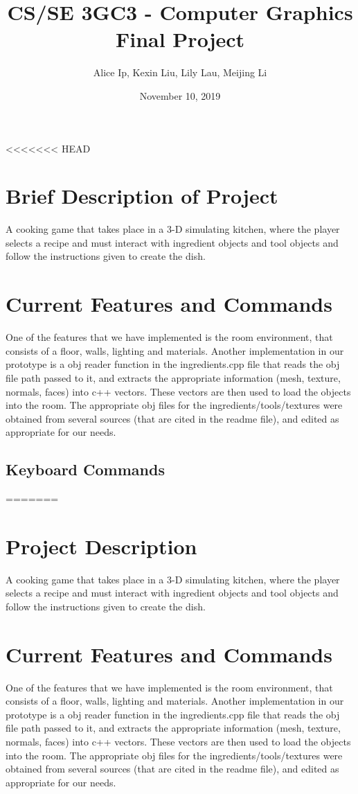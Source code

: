 \documentclass[11pt]{article}
\author{Alice Ip, Kexin Liu, Lily Lau, Meijing Li}
\date{November 10, 2019}
\title{CS/SE 3GC3 - Computer Graphics Final Project}
\begin{document}
\maketitle

<<<<<<< HEAD
\section*{Brief Description of Project}
\label{sec:org14152ec}
A cooking game that takes place in a 3-D simulating kitchen, where the player selects a recipe and must interact with ingredient objects and tool objects and follow the instructions given to create the dish.


\section*{Current Features and Commands}
\label{sec:orga6520a9}
One of the features that we have implemented is the room environment, that consists of a floor, walls, lighting and materials. Another implementation in our prototype is a obj reader function in the ingredients.cpp file that reads the obj file path passed to it, and extracts the appropriate information (mesh, texture, normals, faces) into c++ vectors. These vectors are then used to load the objects into the room. The appropriate obj files for the ingredients/tools/textures were obtained from several sources (that are cited in the readme file), and edited as appropriate for our needs. 

\subsection*{Keyboard Commands}
\label{sec:org454b11b}
=======
\section*{Project Description}
\label{sec:org20b9486}
A cooking game that takes place in a 3-D simulating kitchen, where the player selects a recipe and must interact with ingredient objects and tool objects and follow the instructions given to create the dish.

\section*{Current Features and Commands}
\label{sec:org2a7d9f6}
One of the features that we have implemented is the room environment, that consists of a floor, walls, lighting and materials. Another implementation in our prototype is a obj reader function in the ingredients.cpp file that reads the obj file path passed to it, and extracts the appropriate information (mesh, texture, normals, faces) into c++ vectors. These vectors are then used to load the objects into the room. The appropriate obj files for the ingredients/tools/textures were obtained from several sources (that are cited in the readme file), and edited as appropriate for our needs. 
\end{document}
